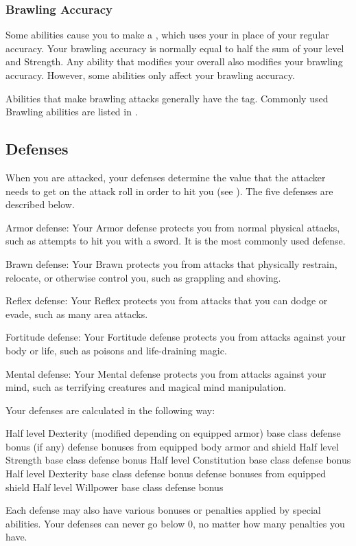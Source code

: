     \subsubsection{Brawling Accuracy}\label{Brawling Accuracy}
      Some abilities cause you to make a , which uses your  in place of your regular accuracy.
      Your brawling accuracy is normally equal to half the sum of your level and Strength.
      Any ability that modifies your overall  also modifies your brawling accuracy.
      However, some abilities only affect your brawling accuracy.

      Abilities that make brawling attacks generally have the \atBrawling tag.
      Commonly used Brawling abilities are listed in .

  \subsection{Defenses}\label{Defenses}
    When you are attacked, your defenses determine the value that the attacker needs to get on the attack roll in order to hit you (see ).
    The five defenses are described below.
    \begin{raggeditemize}
      \item Armor defense: Your Armor defense protects you from normal physical attacks, such as attempts to hit you with a sword.
        It is the most commonly used defense.
      \item Brawn defense: Your Brawn protects you from attacks that physically restrain, relocate, or otherwise control you, such as grappling and shoving.
      \item Reflex defense: Your Reflex protects you from attacks that you can dodge or evade, such as many area attacks.
      \item Fortitude defense: Your Fortitude defense protects you from attacks against your body or life, such as poisons and life-draining magic.
      \item Mental defense: Your Mental defense protects you from attacks against your mind, such as terrifying creatures and magical mind manipulation.
    \end{raggeditemize}

    Your defenses are calculated in the following way:
    \begin{raggeditemize}
       Half level \add Dexterity (modified depending on equipped armor) \add base class defense bonus (if any) \add defense bonuses from equipped body armor and shield
       Half level \add Strength \add base class defense bonus
       Half level \add Constitution \add base class defense bonus
       Half level \add Dexterity \add base class defense bonus \add defense bonuses from equipped shield
       Half level \add Willpower \add base class defense bonus
    \end{raggeditemize}
    Each defense may also have various bonuses or penalties applied by special abilities.
    Your defenses can never go below 0, no matter how many penalties you have.

